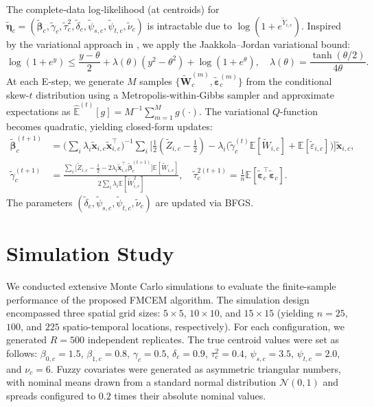 \documentclass[twoside]{article}
\begin{document}
The complete‑data log‑likelihood (at centroids) for \(\tilde{\boldsymbol{\eta}}_c=(\tilde{\boldsymbol{\beta}}_c,\tilde{\gamma}_c,\tilde{\tau}_c^2,\tilde{\delta}_c,\tilde{\psi}_{s,c},\tilde{\psi}_{t,c},\tilde{\nu}_c)\) is intractable due to \(\log(1+e^{\tilde{Y}_{i,c}})\). Inspired by the variational approach in \citep{Charizanos2024}, we apply the Jaakkola–Jordan variational bound:
\[
\log(1+e^{y}) \le \frac{y-\theta}{2}+\lambda(\theta)(y^2-\theta^2)+\log(1+e^{\theta}),\quad \lambda(\theta)=\frac{\tanh(\theta/2)}{4\theta}.
\]
At each E‑step, we generate \(M\) samples \(\{\tilde{\mathbf{W}}_c^{(m)},\tilde{\boldsymbol{\varepsilon}}_c^{(m)}\}\) from the conditional skew-\(t\) distribution using a Metropolis‑within‑Gibbs sampler and approximate expectations as \(\widehat{\mathbb{E}}^{(t)}[g]=M^{-1}\sum_{m=1}^M g(\cdot)\). The variational \(Q\)-function becomes quadratic, yielding closed‑form updates:
\begin{align*}
\tilde{\boldsymbol{\beta}}_c^{(t+1)} &=\Big(\sum_i \lambda_i \tilde{\mathbf{x}}_{i,c}\tilde{\mathbf{x}}_{i,c}^\top\Big)^{-1}\sum_i \Big[\frac12(\tilde{Z}_{i,c}-\tfrac12)-\lambda_i\big(\tilde{\gamma}_c^{(t)}\mathbb{E}[\tilde{W}_{i,c}]+\mathbb{E}[\tilde{\varepsilon}_{i,c}]\big)\Big]\tilde{\mathbf{x}}_{i,c},\\
\tilde{\gamma}_c^{(t+1)} &=\frac{\sum_i \big[\tilde{Z}_{i,c}-\frac12-2\lambda_i\tilde{\mathbf{x}}_{i,c}^\top\tilde{\boldsymbol{\beta}}_c^{(t+1)}\big]\mathbb{E}[\tilde{W}_{i,c}]}{2\sum_i \lambda_i\mathbb{E}[\tilde{W}_{i,c}^2]},\quad
\tilde{\tau}_c^{2(t+1)}=\frac1n\mathbb{E}[\tilde{\boldsymbol{\varepsilon}}_c^\top\tilde{\boldsymbol{\varepsilon}}_c].
\end{align*}
The parameters \((\tilde{\delta}_c,\tilde{\psi}_{s,c},\tilde{\psi}_{t,c},\tilde{\nu}_c)\) are updated via BFGS.

\section{Simulation Study}
We conducted extensive Monte Carlo simulations to evaluate the finite-sample performance of the proposed FMCEM algorithm. The simulation design encompassed three spatial grid sizes: $5 \times 5$, $10 \times 10$, and $15 \times 15$ (yielding $n=25$, $100$, and $225$ spatio-temporal locations, respectively). For each configuration, we generated $R=500$ independent replicates. The true centroid values were set as follows: $\beta_{0,c}=1.5$, $\beta_{1,c}=0.8$, $\gamma_c=0.5$, $\delta_c=0.9$, $\tau_c^2=0.4$, $\psi_{s,c}=3.5$, $\psi_{t,c}=2.0$, and $\nu_c=6$. Fuzzy covariates were generated as asymmetric triangular numbers, with nominal means drawn from a standard normal distribution $\mathcal{N}(0,1)$ and spreads configured to $0.2$ times their absolute nominal values.
\end{document}
